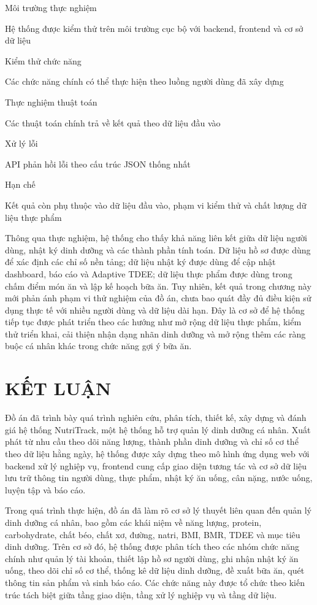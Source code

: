 \documentclass[12pt, a4paper]{report}
\begin{document}
Môi trường thực nghiệm

Hệ thống được kiểm thử trên môi trường cục bộ với backend, frontend và cơ sở dữ liệu

Kiểm thử chức năng

Các chức năng chính có thể thực hiện theo luồng người dùng đã xây dựng

Thực nghiệm thuật toán

Các thuật toán chính trả về kết quả theo dữ liệu đầu vào

Xử lý lỗi

API phản hồi lỗi theo cấu trúc JSON thống nhất

Hạn chế

Kết quả còn phụ thuộc vào dữ liệu đầu vào, phạm vi kiểm thử và chất lượng dữ liệu thực phẩm

Thông qua thực nghiệm, hệ thống cho thấy khả năng liên kết giữa dữ liệu người dùng, nhật ký dinh dưỡng và các thành phần tính toán. Dữ liệu hồ sơ được dùng để xác định các chỉ số nền tảng; dữ liệu nhật ký được dùng để cập nhật dashboard, báo cáo và Adaptive TDEE; dữ liệu thực phẩm được dùng trong chấm điểm món ăn và lập kế hoạch bữa ăn. Tuy nhiên, kết quả trong chương này mới phản ánh phạm vi thử nghiệm của đồ án, chưa bao quát đầy đủ điều kiện sử dụng thực tế với nhiều người dùng và dữ liệu dài hạn. Đây là cơ sở để hệ thống tiếp tục được phát triển theo các hướng như mở rộng dữ liệu thực phẩm, kiểm thử triển khai, cải thiện nhận dạng nhãn dinh dưỡng và mở rộng thêm các ràng buộc cá nhân khác trong chức năng gợi ý bữa ăn.


\chapter*{KẾT LUẬN}
Đồ án đã trình bày quá trình nghiên cứu, phân tích, thiết kế, xây dựng và đánh giá hệ thống NutriTrack, một hệ thống hỗ trợ quản lý dinh dưỡng cá nhân. Xuất phát từ nhu cầu theo dõi năng lượng, thành phần dinh dưỡng và chỉ số cơ thể theo dữ liệu hằng ngày, hệ thống được xây dựng theo mô hình ứng dụng web với backend xử lý nghiệp vụ, frontend cung cấp giao diện tương tác và cơ sở dữ liệu lưu trữ thông tin người dùng, thực phẩm, nhật ký ăn uống, cân nặng, nước uống, luyện tập và báo cáo.

Trong quá trình thực hiện, đồ án đã làm rõ cơ sở lý thuyết liên quan đến quản lý dinh dưỡng cá nhân, bao gồm các khái niệm về năng lượng, protein, carbohydrate, chất béo, chất xơ, đường, natri, BMI, BMR, TDEE và mục tiêu dinh dưỡng. Trên cơ sở đó, hệ thống được phân tích theo các nhóm chức năng chính như quản lý tài khoản, thiết lập hồ sơ người dùng, ghi nhận nhật ký ăn uống, theo dõi chỉ số cơ thể, thống kê dữ liệu dinh dưỡng, đề xuất bữa ăn, quét thông tin sản phẩm và sinh báo cáo. Các chức năng này được tổ chức theo kiến trúc tách biệt giữa tầng giao diện, tầng xử lý nghiệp vụ và tầng dữ liệu.
\end{document}

